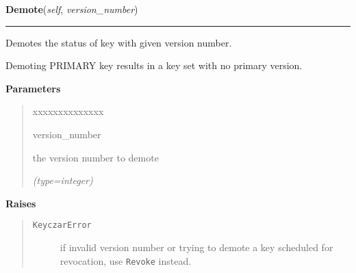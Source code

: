     \label{keyczar:keyczar:Keyczar:Demote}

    \vspace{0.5ex}

\hspace{.8\funcindent}\begin{boxedminipage}{\funcwidth}

    \raggedright \textbf{Demote}(\textit{self}, \textit{version\_number})

    \vspace{-1.5ex}

    \rule{\textwidth}{0.5\fboxrule}
\setlength{\parskip}{2ex}
    Demotes the status of key with given version number.

    Demoting PRIMARY key results in a key set with no primary version.

\setlength{\parskip}{1ex}
      \textbf{Parameters}
      \vspace{-1ex}

      \begin{quote}
        \begin{Ventry}{xxxxxxxxxxxxxx}

          \item[version\_number]

          the version number to demote

            {\it (type=integer)}

        \end{Ventry}

      \end{quote}

      \textbf{Raises}
    \vspace{-1ex}

      \begin{quote}
        \begin{description}

          \item[\texttt{KeyczarError}]

          if invalid version number or trying to demote a key scheduled for
          revocation, use \texttt{Revoke} instead.

        \end{description}

      \end{quote}

    \end{boxedminipage}

